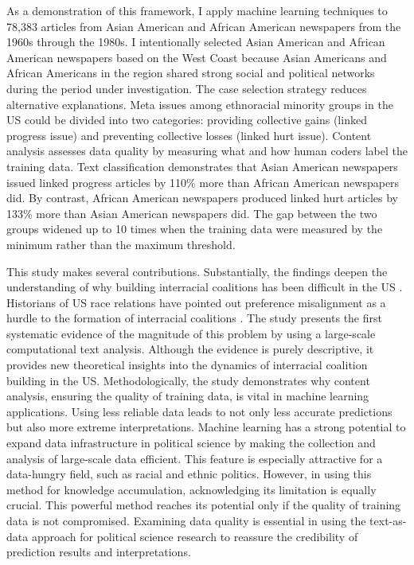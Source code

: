 \documentclass[12 pt]{article}
\begin{document}
As a demonstration of this framework, I apply machine learning techniques to 78,383 articles from Asian American and African American newspapers from the 1960s through the 1980s. I intentionally selected Asian American and African American newspapers based on the West Coast because Asian Americans and African Americans in the region shared strong social and political networks during the period under investigation. The case selection strategy reduces alternative explanations. Meta issues among ethnoracial minority groups in the US could be divided into two categories: providing collective gains (linked progress issue) and preventing collective losses (linked hurt issue). Content analysis assesses data quality by measuring what and how human coders label the training data. Text classification demonstrates that Asian American newspapers issued linked progress articles by 110\% more than African American newspapers did. By contrast, African American newspapers produced linked hurt articles by 133\% more than Asian American newspapers did. The gap between the two groups widened up to 10 times when the training data were measured by the minimum rather than the maximum threshold. 

This study makes several contributions. Substantially, the findings deepen the understanding of why building interracial coalitions has been difficult in the US \citep{kaufmann2003cracks, rogers2006afro}. Historians of US race relations have pointed out preference misalignment as a hurdle to the formation of interracial coalitions \citep{brilliant2010color, kurashige2010shifting}. The study presents the first systematic evidence of the magnitude of this problem by using a large-scale computational text analysis. Although the evidence is purely descriptive, it provides new theoretical insights into the dynamics of interracial coalition building in the US. Methodologically, the study demonstrates why content analysis, ensuring the quality of training data, is vital in machine learning applications. Using less reliable data leads to not only less accurate predictions but also more extreme interpretations. Machine learning has a strong potential to expand data infrastructure in political science by making the collection and analysis of large-scale data efficient. This feature is especially attractive for a data-hungry field, such as racial and ethnic politics. However, in using this method for knowledge accumulation, acknowledging its limitation is equally crucial. This powerful method reaches its potential only if the quality of training data is not compromised. Examining data quality is essential in using the text-as-data approach for political science research to reassure the credibility of prediction results and interpretations.
\end{document}
